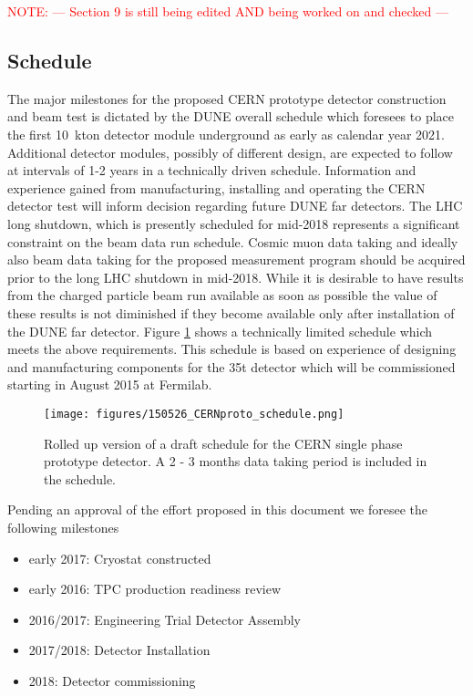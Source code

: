 \label{organ}
\textcolor{red}{NOTE: --- Section 9 is still being edited AND being worked on and checked ---}

\subsection{Schedule}
The major milestones for the proposed CERN prototype detector construction and beam test is dictated by the DUNE overall schedule which foresees to place the first 10~kton detector module underground as early as calendar year 2021. Additional detector modules, possibly of different design, are expected to follow at intervals of 1-2 years in a technically driven schedule.
Information and experience gained from manufacturing, installing and operating the CERN detector test will inform decision regarding future DUNE far detectors.
The LHC long shutdown, which is presently scheduled for mid-2018 represents a significant constraint on the beam data run schedule.
Cosmic muon data taking and ideally also beam data taking for the proposed measurement program 
should be acquired prior to  the long LHC shutdown in mid-2018. 
While it is desirable to have results from the charged particle beam run available as soon as possible the value of these results is not diminished if they become available only after installation of the DUNE far detector.
Figure \ref{fig:schedule} shows a technically limited schedule which meets the above requirements.
This schedule is based on experience of designing and manufacturing components for the 35t detector which will be commissioned starting in August 2015 at  Fermilab.
%
\begin{figure}[htb]
  \centering
\texttt{[image: figures/150526\_CERNproto\_schedule.png]}
  \caption{Rolled up version of a draft schedule for the CERN single phase prototype detector. A 2 - 3 months data taking period is included in the schedule. }
  \label{fig:schedule}
\end{figure}
%
Pending an approval of the effort proposed in this document we foresee the following milestones
\begin{itemize}
\item early 2017: Cryostat constructed
\item early 2016: TPC production readiness review
\item 2016/2017: Engineering Trial Detector Assembly
\item 2017/2018: Detector Installation
\item 2018: Detector commissioning 
\end{itemize}


